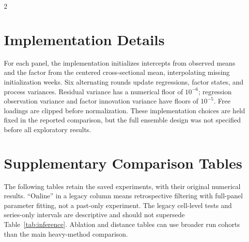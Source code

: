 \documentclass[sigconf,nonacm,balance=false]{acmart}
\begin{document}
\FloatBarrier
\onecolumn
\begin{multicols}{2}
\begingroup
{}


\endgroup
\end{multicols}
\appendix
\begingroup
\newenvironment{appendixflowtable}{%
  \par\addvspace{7pt}\noindent\begin{minipage}{\linewidth}%
  \captionsetup{type=table}\centering
}{\end{minipage}\par\addvspace{5pt}}
\renewenvironment{table}[1][]{\begin{appendixflowtable}}{\end{appendixflowtable}}
\renewenvironment{table*}[1][]{\begin{appendixflowtable}}{\end{appendixflowtable}}
\section{Implementation Details}\label{app:implementation}

For each panel, the implementation initializes intercepts from observed means and the factor from the centered cross-sectional mean, interpolating missing initialization weeks. Six alternating rounds update regressions, factor states, and process variances. Residual variance has a numerical floor of $10^{-6}$; regression observation variance and factor innovation variance have floors of $10^{-5}$. Free loadings are clipped before normalization. These implementation choices are held fixed in the reported comparison, but the full ensemble design was not specified before all exploratory results.



\section{Supplementary Comparison Tables}
The following tables retain the saved experiments, with their original numerical results. ``Online'' in a legacy column means retrospective filtering with full-panel parameter fitting, not a past-only experiment. The legacy cell-level tests and series-only intervals are descriptive and should not supersede Table~\ref{tab:inference}. Ablation and distance tables can use broader run cohorts than the main heavy-method comparison.





\noindent\begin{minipage}[t]{0.49\linewidth}\vskip0pt\relax


\end{minipage}\hfill
\begin{minipage}[t]{0.49\linewidth}\vskip0pt\relax


\end{minipage}

\endgroup
\end{document}
